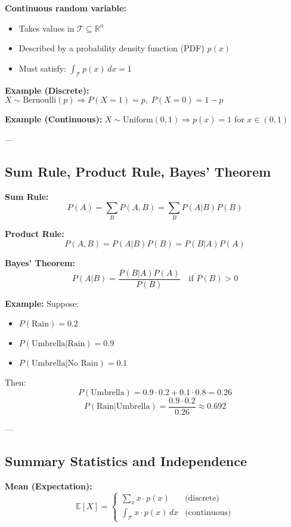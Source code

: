 \textbf{Continuous random variable:}
\begin{itemize}
    \item Takes values in \( \mathcal{T} \subseteq \mathbb{R}^n \)
    \item Described by a probability density function (PDF) \( p(x) \)
    \item Must satisfy: \( \int_{\mathcal{T}} p(x)\, dx = 1 \)
\end{itemize}

\textbf{Example (Discrete):}  
\( X \sim \text{Bernoulli}(p) \Rightarrow P(X=1)=p, \; P(X=0)=1-p \)

\textbf{Example (Continuous):}  
\( X \sim \text{Uniform}(0,1) \Rightarrow p(x) = 1 \) for \( x \in (0,1) \)

---

\subsection{Sum Rule, Product Rule, Bayes' Theorem}

\textbf{Sum Rule:}
\[
P(A) = \sum_B P(A, B) = \sum_B P(A|B)P(B)
\]

\textbf{Product Rule:}
\[
P(A, B) = P(A|B)P(B) = P(B|A)P(A)
\]

\textbf{Bayes' Theorem:}
\[
P(A|B) = \frac{P(B|A)P(A)}{P(B)} \quad \text{if } P(B) > 0
\]

\textbf{Example:}  
Suppose:
\begin{itemize}
    \item \( P(\text{Rain}) = 0.2 \)
    \item \( P(\text{Umbrella}|\text{Rain}) = 0.9 \)
    \item \( P(\text{Umbrella}|\text{No Rain}) = 0.1 \)
\end{itemize}

Then:
\[
P(\text{Umbrella}) = 0.9 \cdot 0.2 + 0.1 \cdot 0.8 = 0.26
\]
\[
P(\text{Rain}|\text{Umbrella}) = \frac{0.9 \cdot 0.2}{0.26} \approx 0.692
\]

---

\subsection{Summary Statistics and Independence}

\textbf{Mean (Expectation):}
\[
\mathbb{E}[X] = 
\begin{cases}
\sum_x x \cdot p(x) & \text{(discrete)} \\
\int_{\mathcal{T}} x \cdot p(x) \, dx & \text{(continuous)}
\end{cases}
\]

